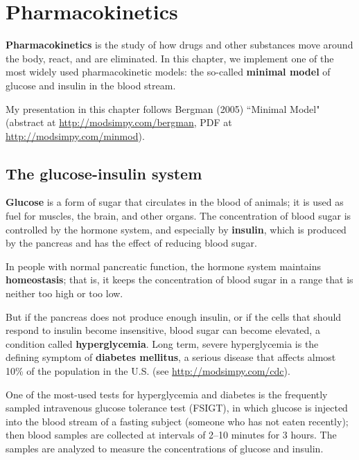 \documentclass[12pt]{book}
\theoremstyle{exercise}
\begin{document}
\chapter{Pharmacokinetics}
\label{chap17}

{\bf Pharmacokinetics} is the study of how drugs and other substances move around the body, react, and are eliminated.  In this chapter, we implement one of the most widely used pharmacokinetic models: the so-called {\bf minimal model} of glucose and insulin in the blood stream.




My presentation in this chapter follows Bergman (2005) ``Minimal Model" (abstract at \url{http://modsimpy.com/bergman},
PDF at \url{http://modsimpy.com/minmod}).


\section{The glucose-insulin system}

{\bf Glucose} is a form of sugar that circulates in the blood of animals; it is used as fuel for muscles, the brain, and other organs.  The concentration of blood sugar is controlled by the hormone system, and especially by {\bf insulin}, which is produced by the pancreas and has the effect of reducing blood sugar.


In people with normal pancreatic function, the hormone system maintains {\bf homeostasis}; that is, it keeps the concentration of blood sugar in a range that is neither too high or too low.

But if the pancreas does not produce enough insulin, or if the cells that should respond to insulin become insensitive, blood sugar can become elevated, a condition called {\bf hyperglycemia}.  Long term, severe hyperglycemia is the defining symptom of {\bf diabetes mellitus}, a serious disease that affects almost 10\% of the population in the U.S. (see \url{http://modsimpy.com/cdc}).


One of the most-used tests for hyperglycemia and diabetes is the frequently sampled intravenous glucose tolerance test (FSIGT), in which glucose is injected into the blood stream of a fasting subject (someone who has not eaten recently); then blood samples are collected at intervals of 2--10 minutes for 3 hours.  The samples are analyzed to measure the concentrations of glucose and insulin.
\end{document}
